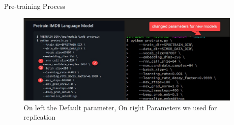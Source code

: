 \documentclass[aspectratio=169,xcolor=dvipsnames]{beamer}
\begin{document}
\begin{frame}{Pre-training Process}
    \tableofcontents


  \begin{figure}
   \includegraphics[width=420]{updated_model_1.jpg}
      \caption{On left the Default parameter, On right Parameters we used for replication}
\end{figure}

\end{frame}
\end{document}
